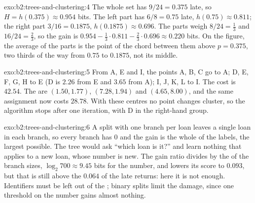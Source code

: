 \begin{solution}{exo:b2:trees-and-clustering:4}
The whole set has $9/24 = 0.375$ late, so $H = h(0.375) \approx 0.954$ bits. The left part has $6/8 = 0.75$ late,
$h(0.75) \approx 0.811$; the right part $3/16 = 0.1875$, $h(0.1875) \approx 0.696$. The parts weigh $8/24 = \tfrac13$ and
$16/24 = \tfrac23$, so the gain is $0.954 - \tfrac{1}{3} \cdot 0.811 - \tfrac{2}{3} \cdot 0.696 \approx 0.220$ bits. On
the  figure, the average of the parts is the point of the chord between them above $p = 0.375$, two thirds of
the way from $0.75$ to $0.1875$, not its middle.
\end{solution}

\begin{solution}{exo:b2:trees-and-clustering:5}
From A, E and I, the points A, B, C go to A; D, E, F, G, H to E (D is $2.26$ from E and $3.65$ from A); I, J, K, L to I.
The cost is $42.54$. The  are $(1.50, 1.77)$, $(7.28, 1.94)$ and $(4.65, 8.00)$, and the same assignment now
costs $28.78$. With these centres no point changes cluster, so the algorithm stops after one iteration, with D in the
right-hand group.
\end{solution}

\begin{solution}{exo:b2:trees-and-clustering:6}
A split with one branch per loan leaves a single loan in each branch, so every branch has  $0$ and the gain is the
whole  of the labels, the largest possible. The tree would ask ``which loan is it?'' and learn nothing that applies
to a new loan, whose number is new. The gain ratio divides by the  of the branch sizes, $\log_2 700 \approx
9.45$ bits for the number, and lowers its score to $0.093$, but that is still above the $0.064$ of the late returns: here
it is not enough. Identifiers must be left out of the ; binary splits limit the damage, since one threshold on the
number gains almost nothing.
\end{solution}

